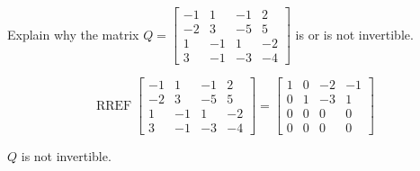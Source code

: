 
\begin{exerciseStatement}


Explain why the matrix \(Q= \left[\begin{array}{cccc}
-1 & 1 & -1 & 2 \\
-2 & 3 & -5 & 5 \\
1 & -1 & 1 & -2 \\
3 & -1 & -3 & -4
\end{array}\right] \) is or is not invertible.


\end{exerciseStatement}
    
\begin{exerciseAnswer} 


\[\operatorname{RREF} \left[\begin{array}{cccc}
-1 & 1 & -1 & 2 \\
-2 & 3 & -5 & 5 \\
1 & -1 & 1 & -2 \\
3 & -1 & -3 & -4
\end{array}\right] = \left[\begin{array}{cccc}
1 & 0 & -2 & -1 \\
0 & 1 & -3 & 1 \\
0 & 0 & 0 & 0 \\
0 & 0 & 0 & 0
\end{array}\right] \]

\(Q\) is not invertible.
\end{exerciseAnswer}
    
